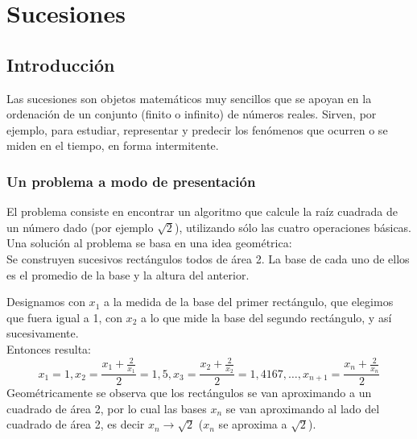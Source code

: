 \documentclass[../Teoría.root.tex]{subfiles}
\begin{document}
    \section{Sucesiones}
    \subsection{Introducción}
    Las sucesiones son objetos matemáticos muy sencillos que se apoyan en la ordenación de un conjunto (finito o infinito) de números reales. Sirven, por ejemplo, para estudiar, representar y predecir los fenómenos que ocurren o se miden en el tiempo, en forma intermitente.
    \subsubsection{Un problema a modo de presentación}
    El problema consiste en encontrar un algoritmo que calcule la raíz cuadrada de un número dado (por ejemplo \(\sqrt{2}\)), utilizando sólo las cuatro operaciones básicas.\\
    Una solución al problema se basa en una idea geométrica:\\
    Se construyen sucesivos rectángulos todos de área 2. La base de cada uno de ellos es el promedio de la base y la altura del anterior.
    \begin{center}
        \begin{scaletikzpicturetowidth}{\linewidth}
        \end{scaletikzpicturetowidth}
    \end{center}
    Designamos con \(x_1\) a la medida de la base del primer rectángulo, que elegimos que fuera igual a 1, con \(x_2\) a lo que mide la base del segundo rectángulo, y así sucesivamente.\\
    Entonces resulta: \[x_1=1,x_2=\frac{x_1+\frac{2}{x_1}}{2}=1,5,x_3=\frac{x_2+\frac{2}{x_2}}{2}=1,4167,\dots,x_{n+1}=\frac{x_n+\frac{2}{x_n}}{2}\]
    Geométricamente se observa que los rectángulos se van aproximando a un cuadrado de área 2, por lo cual las bases \(x_n\) se van aproximando al lado del cuadrado de área 2, es decir \(x_n\rightarrow\sqrt{2}\) (\(x_n\) se aproxima a \(\sqrt{2}\)).\\
\end{document}
